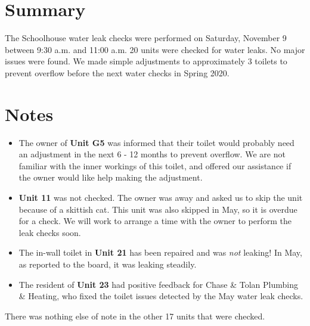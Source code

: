 \documentclass[letterpaper,10pt]{texMemo}
\begin{document}
\maketitle

\section*{Summary}

The Schoolhouse water leak checks were performed on Saturday, November 9 between 9:30 a.m. and 11:00 a.m. 20 units were checked for water leaks. No major issues were found. We made simple adjustments to approximately 3 toilets to prevent overflow before the next water checks in Spring 2020.

\section*{Notes}

\begin{itemize}

\item The owner of \textbf{Unit G5} was informed that their toilet would probably need an adjustment in the next 6 - 12 months to prevent overflow. We are not familiar with the inner workings of this toilet, and offered our assistance if the owner would like help making the adjustment.

\item \textbf{Unit 11} was not checked. The owner was away and asked us to skip the unit because of a skittish cat. This unit was also skipped in May, so it is overdue for a check. We will work to arrange a time with the owner to perform the leak checks soon.

\item The in-wall toilet in \textbf{Unit 21} has been repaired and was \emph{not} leaking! In May, as reported to the board, it was leaking steadily.

\item The resident of \textbf{Unit 23} had positive feedback for Chase \& Tolan Plumbing \& Heating, who fixed the toilet issues detected by the May water leak checks.

\end{itemize}

There was nothing else of note in the other 17 units that were checked.
\end{document}
